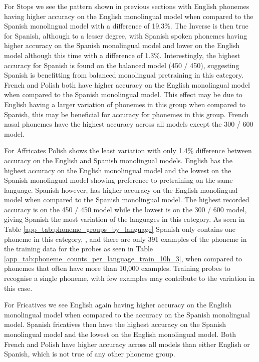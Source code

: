 \begin{table}
For Stops we see the pattern shown in previous sections with English phonemes having higher accuracy on the English monolingual model when compared to the Spanish monolingual model with a difference of 19.3\%. The Inverse is then true for Spanish, although to a lesser degree, with Spanish spoken phonemes having higher accuracy on the Spanish monolingual model and lower on the English model although this time with a difference of 1.3\%. Interestingly, the highest accuracy for Spanish is found on the balanced model (450 / 450), suggesting Spanish is benefitting from balanced monolingual pretraining in this category. French and Polish both have higher accuracy on the English monolingual model when compared to the Spanish monolingual model. This effect may be due to English having a larger variation of phonemes in this group when compared to Spanish, this may be beneficial for accuracy for phonemes in this group. French nasal phonemes have the highest accuracy across all models except the 300 / 600 model. 

For Affricates Polish shows the least variation with only 1.4\% difference between accuracy on the English and Spanish monolingual models. English has the highest accuracy on the English monolingual model and the lowest on the Spanish monolingual model showing preference to pretraining on the same language. Spanish however, has higher accuracy on the English monolingual model when compared to the Spanish monolingual model. The highest recorded accuracy is on the 450 / 450 model while the lowest is on the 300 / 600 model, giving Spanish the most variation of the languages in this category. As seen in Table \ref{app_tab:phoneme_groups_by_language} Spanish only contains one phoneme in this category, , and there are only 391 examples of the phoneme in the training data for the probes as seen in Table \ref{app_tab:phoneme_counts_per_language_train_10h_3}, when compared to phonemes that often have more than 10,000 examples. Training probes to recognise a single phoneme, with few examples may contribute to the variation in this case.

For Fricatives we see English again having higher accuracy on the English monolingual model when compared to the accuracy on the Spanish monolingual model. Spanish fricatives then have the highest accuracy on the Spanish monolingual model and the lowest on the English monolingual model. Both French and Polish have higher accuracy across all models than either English or Spanish, which is not true of any other phoneme group.


\end{table}
